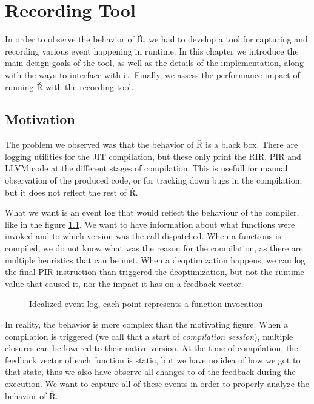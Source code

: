 \chapter{Recording Tool}\label{ch:recording-tool}

\begin{chapterabstract}
  In order to observe the behavior of Ř, we had to develop a tool for capturing and recording various event happening in runtime. In this chapter we introduce the main design goals of the tool, as well as the details of the implementation, along with the ways to interface with it. Finally, we assess the performance impact of running Ř with the recording tool.
\end{chapterabstract}

\section{Motivation}

The problem we observed was that the behavior of Ř is a black box. There are logging utilities for the JIT compilation, but these only print the RIR, PIR and LLVM code at the different stages of compilation. This is usefull for manual observation of the produced code, or for tracking down bugs in the compilation, but it does not reflect the rest of Ř.

What we want is an event log that would reflect the behaviour of the compiler, like in the figure \ref{fig:motivation-events}. We want to have information about what functions were invoked and to which version was the call dispatched. When a functions is compiled, we do not know what was the reason for the compilation, as there are multiple heuristics that can be met. When a deoptimization happens, we can log the final PIR instruction than triggered the deoptimization, but not the runtime value that caused it, nor the impact it has on a feedback vector.

\begin{figure}[h]
	\centering
	\caption{Idealized event log, each point represents a function invocation}\label{fig:motivation-events}
\end{figure}

In reality, the behavior is more complex than the motivating figure. When a compilation is triggered (we call that a start of \textit{compilation session}), multiple closures can be lowered to their native version. At the time of compilation, the feedback vector of each function is static, but we have no idea of how we got to that state, thus we also have observe all changes to of the feedback during the execution. We want to capture all of these events in order to properly analyze the behavior of Ř.

